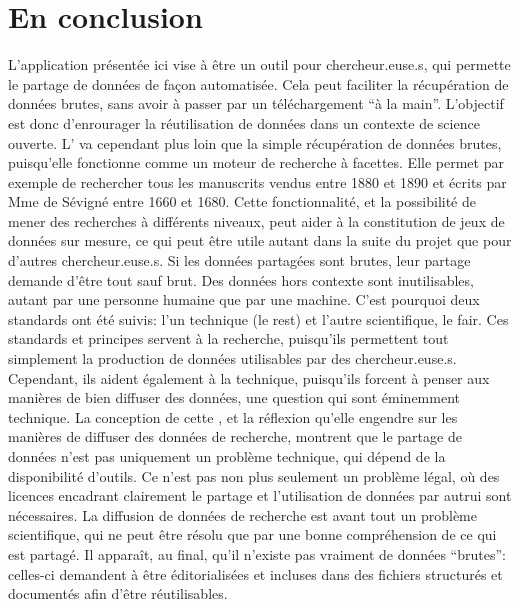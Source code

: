 \section{En conclusion}
L'application présentée ici vise à être un outil pour chercheur.euse.s, qui permette le partage de données de façon automatisée. Cela peut faciliter la récupération de données brutes, sans avoir à passer par un téléchargement \enquote{à la main}. L'objectif est donc d'enrourager la réutilisation de données dans un contexte de science ouverte. L'\api{} va cependant plus loin que la simple récupération de données brutes, puisqu'elle fonctionne comme un moteur de recherche à facettes. Elle permet par exemple de rechercher tous les manuscrits vendus entre 1880 et 1890 et écrits par Mme de Sévigné entre 1660 et 1680. Cette fonctionnalité, et la possibilité de mener des recherches à différents niveaux, peut aider à la constitution de jeux de données sur mesure, ce qui peut être utile autant dans la suite du projet que pour d'autres chercheur.euse.s. Si les données partagées sont brutes, leur partage demande d'être tout sauf brut. Des données hors contexte sont inutilisables, autant par une personne humaine que par une machine. C'est pourquoi deux standards ont été suivis: l'un technique (le \gls{rest}) et l'autre scientifique, le \gls{fair}. Ces standards et principes servent à la recherche, puisqu'ils permettent tout simplement la production de données utilisables par des chercheur.euse.s. Cependant, ils aident également à la technique, puisqu'ils forcent à penser aux manières de bien diffuser des données, une question qui sont éminemment technique. La conception de cette \api{}, et la réflexion qu'elle engendre sur les manières de diffuser des données de recherche, montrent que le partage de données n'est pas uniquement un problème technique, qui dépend de la disponibilité d'outils. Ce n'est pas non plus seulement un problème légal, où des licences encadrant clairement le partage et l'utilisation de données par autrui sont nécessaires. La diffusion de données de recherche est avant tout un problème scientifique, qui ne peut être résolu que par une bonne compréhension de ce qui est partagé. Il apparaît, au final, qu'il n'existe pas vraiment de données \enquote{brutes}: celles-ci demandent à être éditorialisées et incluses dans des fichiers structurés et documentés afin d'être réutilisables.


